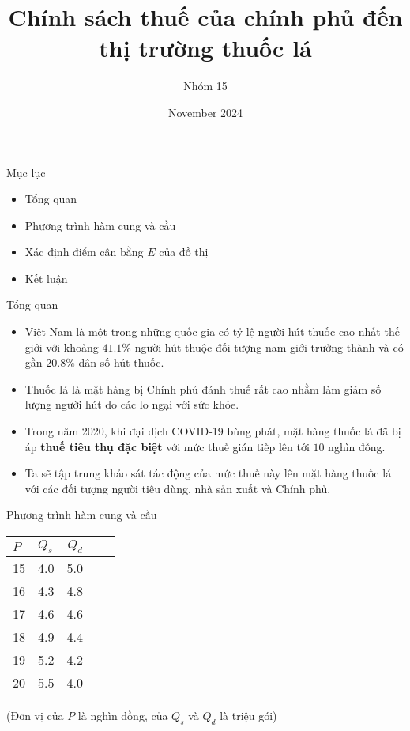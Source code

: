 \documentclass[11pt,aspectratio=169]{beamer}
\title{Chính sách thuế của chính phủ đến thị trường thuốc lá}
\author{Nhóm 15}
\date{November 2024}
\begin{document}
\maketitle
\begin{frame}{Mục lục}
\begin{itemize}
    \item Tổng quan
    \item Phương trình hàm cung và cầu
    \item Xác định điểm cân bằng $E$ của đồ thị
    \item Kết luận
\end{itemize}
\end{frame}
\begin{frame}{Tổng quan}
    \begin{itemize}
        \item Việt Nam là một trong những quốc gia có tỷ lệ người hút thuốc cao nhất thế giới với khoảng $41.1\%$ người hút thuộc đối tượng nam giới trưởng thành và có gần $20.8\%$ dân số hút thuốc.
        \item Thuốc lá là mặt hàng bị Chính phủ đánh thuế rất cao nhằm làm giảm số lượng người hút do các lo ngại với sức khỏe.
        \item Trong năm 2020, khi đại dịch COVID-19 bùng phát, mặt hàng thuốc lá đã bị áp \textbf{thuế tiêu thụ đặc biệt} với mức thuế gián tiếp lên tới $10$ nghìn đồng.
        \item Ta sẽ tập trung khảo sát tác động của mức thuế này lên mặt hàng thuốc lá với các đối tượng người tiêu dùng, nhà sản xuất và Chính phủ.
    \end{itemize}
\end{frame}
\begin{frame}{Phương trình hàm cung và cầu}
    \begin{center}
    \begin{tabular}{llrll}
        \toprule
        $P$   & $Q_{s}$   & $Q_{d}$  \\
        \midrule
         15    & 4.0   & 5.0  \\
         16    & 4.3   & 4.8  \\
         17    & 4.6   & 4.6  \\
         18    & 4.9   & 4.4 \\
         19    & 5.2   & 4.2 \\
         20    & 5.5   & 4.0 \\
        \bottomrule
        \end{tabular}
    \end{center}
(Đơn vị của $P$ là nghìn đồng, của $Q_{s}$ và $Q_{d}$ là triệu gói)
\end{frame}
\end{document}
